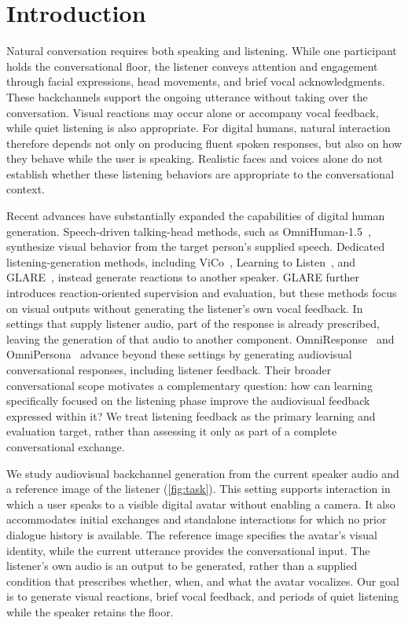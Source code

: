 \section{Introduction}
\label{sec:intro}

Natural conversation requires both speaking and listening. While one
participant holds the conversational floor, the listener conveys
attention and engagement through facial expressions, head movements,
and brief vocal acknowledgments. These backchannels support the
ongoing utterance without taking over the conversation. Visual
reactions may occur alone or accompany vocal feedback, while quiet
listening is also appropriate. For digital humans, natural interaction
therefore depends not only on producing fluent spoken responses, but
also on how they behave while the user is speaking. Realistic faces
and voices alone do not establish whether these listening behaviors
are appropriate to the conversational context.

Recent advances have substantially expanded the capabilities of
digital human generation. Speech-driven talking-head methods, such
as OmniHuman-1.5~\cite{omnihuman15}, synthesize visual behavior from
the target person's supplied speech. Dedicated listening-generation
methods, including ViCo~\cite{vico}, Learning to
Listen~\cite{learningtolisten}, and GLARE~\cite{glare}, instead
generate reactions to another speaker. GLARE further introduces
reaction-oriented supervision and evaluation, but these methods
focus on visual outputs without generating the listener's own
vocal feedback. In settings that supply listener audio, part of
the response is already prescribed, leaving the generation of
that audio to another component. OmniResponse~\cite{omniresponse}
and OmniPersona~\cite{omnipersona} advance beyond these settings
by generating audiovisual conversational responses, including
listener feedback. Their broader conversational scope motivates
a complementary question: how can learning specifically focused
on the listening phase improve the audiovisual feedback expressed
within it? We treat listening feedback as the primary learning
and evaluation target, rather than assessing it only as part of
a complete conversational exchange.

We study audiovisual backchannel generation from the current
speaker audio and a reference image of the listener
(\cref{fig:task}). This setting supports interaction in which a
user speaks to a visible digital avatar without enabling a
camera. It also accommodates initial exchanges and standalone
interactions for which no prior dialogue history is available.
The reference image specifies the avatar's visual identity,
while the current utterance provides the conversational input.
The listener's own audio is an output to be generated, rather
than a supplied condition that prescribes whether, when, and
what the avatar vocalizes. Our goal is to generate visual
reactions, brief vocal feedback, and periods of quiet listening
while the speaker retains the floor.

